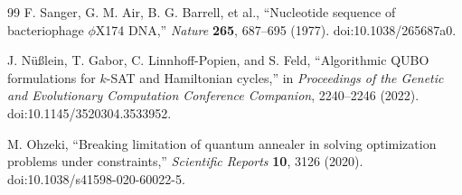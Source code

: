 \documentclass[a4j,10pt]{ujarticle}
\begin{document}
\begin{thebibliography}{99}
F. Sanger, G. M. Air, B. G. Barrell, et al.,
``Nucleotide sequence of bacteriophage $\phi$X174 DNA,''
\textit{Nature}
\textbf{265}, 687--695 (1977).
doi:10.1038/265687a0.

J. N{\"u}{\ss}lein, T. Gabor, C. Linnhoff-Popien, and S. Feld,
``Algorithmic QUBO formulations for $k$-SAT and Hamiltonian cycles,''
in \textit{Proceedings of the Genetic and Evolutionary Computation Conference Companion},
2240--2246 (2022).
doi:10.1145/3520304.3533952.

M. Ohzeki,
``Breaking limitation of quantum annealer in solving optimization problems under constraints,''
\textit{Scientific Reports}
\textbf{10}, 3126 (2020).
doi:10.1038/s41598-020-60022-5.
\end{thebibliography}
\end{document}
